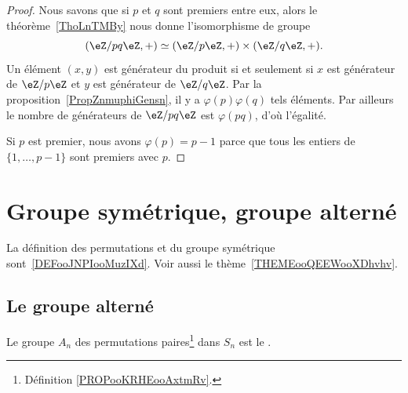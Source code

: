 \begin{proof}
	Nous savons que si \( p\) et \( q\) sont premiers entre eux, alors le théorème~\ref{ThoLnTMBy} nous donne l'isomorphisme de groupe
	\begin{equation}
		(\eZ/pq\eZ,+)\simeq(\eZ/p\eZ,+)\times(\eZ/q\eZ,+).
	\end{equation}
	Un élément \( (x,y)\) est générateur du produit si et seulement si \( x\) est générateur de \( \eZ/p\eZ\) et \( y\) est générateur de \( \eZ/q\eZ\). Par la proposition~\ref{PropZnmuphiGensn}, il y a \( \varphi(p)\varphi(q)\) tels éléments. Par ailleurs le nombre de générateurs de \( \eZ/pq\eZ\) est \( \varphi(pq)\), d'où l'égalité.

	Si \( p\) est premier, nous avons \( \varphi(p)=p-1\) parce que tous les entiers de \( \{ 1,\ldots, p-1 \}\) sont premiers avec \( p\).
\end{proof}


\section{Groupe symétrique, groupe alterné}
\label{SECooZFYQooFfopMa}

La définition des permutations et du groupe symétrique sont~\ref{DEFooJNPIooMuzIXd}. Voir aussi le thème~\ref{THEMEooQEEWooXDhvhv}.

\subsection{Le groupe alterné}

\begin{definition}      \label{DEFooEIVIooFvVkHH}
	Le groupe \( A_n\) des permutations paires\footnote{Définition \ref{PROPooKRHEooAxtmRv}.} dans \( S_n\) est le .
\end{definition}

